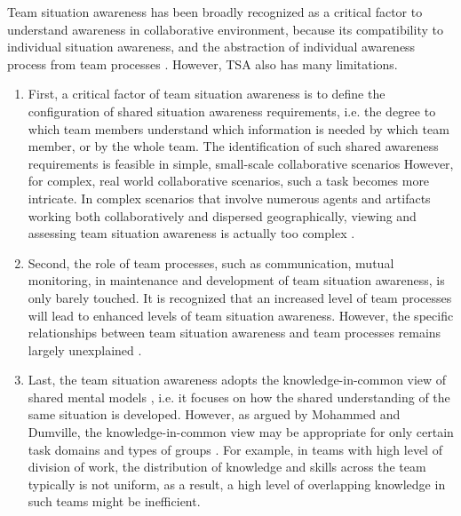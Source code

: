 Team situation awareness has been broadly recognized as a critical factor to understand awareness in collaborative environment, because its compatibility to individual situation awareness, and the abstraction of individual awareness process from team processes \cite{shu2005inference,Salmon2008}. However, TSA also has many limitations.

\begin{enumerate}
 	\item First, a critical factor of team situation awareness is to define the configuration of shared situation awareness requirements, i.e. the degree to which team members understand which information is needed by which team member, or by the whole team. The identification of such shared awareness requirements is feasible in simple, small-scale collaborative scenarios However, for complex, real world collaborative scenarios, such a task becomes more intricate. In complex scenarios that involve numerous agents and artifacts working both collaboratively and dispersed geographically, viewing and assessing team situation awareness is actually too complex \cite{Salmon2008}. 
 	\item Second, the role of team processes, such as communication, mutual monitoring, in maintenance and development of team situation awareness, is only barely touched. It is recognized that an increased level of team processes will lead to enhanced levels of team situation awareness. However, the specific relationships between team situation awareness and team processes remains largely unexplained \cite{Salmon2008}.
 	\item Last, the team situation awareness adopts the knowledge-in-common view of shared mental models \cite{Mohammed2001}, i.e. it focuses on how the shared understanding of the same situation is developed. However, as argued by Mohammed and Dumville, the knowledge-in-common view may be appropriate for only certain task domains and types of groups \cite{Mohammed2001}. For example, in teams with high level of division of work, the distribution of knowledge and skills across the team typically is not uniform, as a result, a high level of overlapping knowledge in such teams might be inefficient.
 \end{enumerate} 


